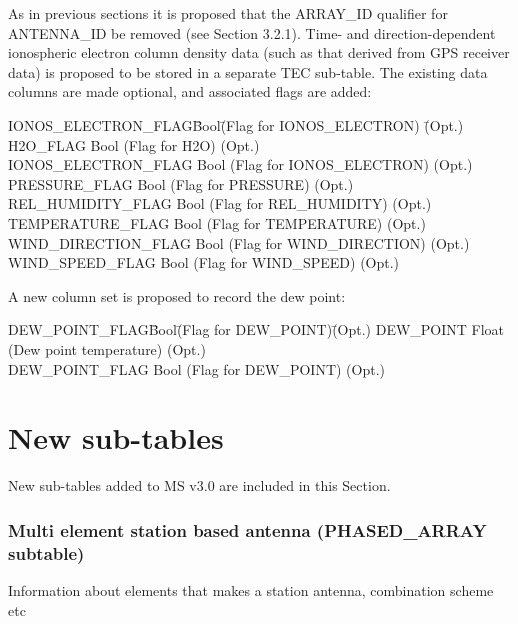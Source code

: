 \documentclass{article}
\begin{document}
\begin{itemize}
As in previous sections it is proposed that the ARRAY\_ID qualifier
for ANTENNA\_ID be removed (see Section 3.2.1). Time- and
direction-dependent ionospheric electron column density data (such as
that derived from GPS receiver data) is proposed to be stored in a
separate TEC sub-table. The existing data columns are made optional,
and associated flags are added:

\begin{tabbing}
IONOS\_ELECTRON\_FLAG\quad\quad \= Bool\quad\quad \= 
(Flag for IONOS\_ELECTRON) \quad\quad \= (Opt.) \\
H2O\_FLAG \> Bool \> (Flag for H2O) \> (Opt.) \\
IONOS\_ELECTRON\_FLAG \> Bool \> (Flag for IONOS\_ELECTRON) \> (Opt.) \\
PRESSURE\_FLAG \> Bool \> (Flag for PRESSURE) \> (Opt.) \\
REL\_HUMIDITY\_FLAG \> Bool \> (Flag for REL\_HUMIDITY) \> (Opt.) \\
TEMPERATURE\_FLAG \> Bool \> (Flag for TEMPERATURE) \> (Opt.) \\
WIND\_DIRECTION\_FLAG \> Bool \> (Flag for WIND\_DIRECTION) \> (Opt.) \\
WIND\_SPEED\_FLAG \> Bool \> (Flag for WIND\_SPEED) \> (Opt.) \\
\end{tabbing}

A new column set is proposed to record the dew point:

\begin{tabbing}
DEW\_POINT\_FLAG\quad\quad   \= Bool\quad\quad  \= 
(Flag for DEW\_POINT)\quad\quad \= (Opt.) \kill
DEW\_POINT \> Float \>  (Dew point temperature) \> (Opt.) \\
DEW\_POINT\_FLAG   \> Bool  \> (Flag for DEW\_POINT) \> (Opt.) \\
\end{tabbing}


\section{New sub-tables}

New sub-tables added to MS v3.0 are included in this Section.

\subsubsection{Multi element station based antenna (PHASED_ARRAY subtable)}

Information about elements that makes a station antenna, combination scheme etc


\end{itemize}
\end{document}
